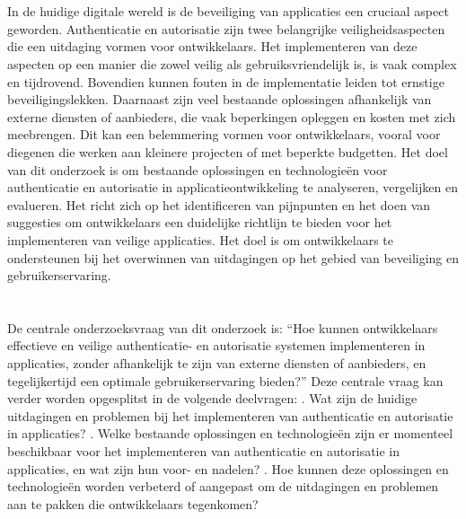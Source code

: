 \section{}%
\label{sec:probleemstelling}
In de huidige digitale wereld is de beveiliging van applicaties een cruciaal aspect geworden. Authenticatie en autorisatie zijn twee belangrijke veiligheidsaspecten die een uitdaging vormen voor ontwikkelaars. 
Het implementeren van deze aspecten op een manier die zowel veilig als gebruiksvriendelijk is, is vaak complex en tijdrovend. Bovendien kunnen fouten in de implementatie leiden tot ernstige beveiligingslekken. 
\newline
Daarnaast zijn veel bestaande oplossingen afhankelijk van externe diensten of aanbieders, die vaak beperkingen opleggen en kosten met zich meebrengen. Dit kan een belemmering vormen voor ontwikkelaars, 
vooral voor diegenen die werken aan kleinere projecten of met beperkte budgetten.
\newline
Het doel van dit onderzoek is om bestaande oplossingen en technologieën voor authenticatie en autorisatie in applicatieontwikkeling te analyseren, vergelijken en evalueren. 
Het richt zich op het identificeren van pijnpunten en het doen van suggesties om ontwikkelaars een duidelijke richtlijn te bieden voor het implementeren van veilige applicaties. 
Het doel is om ontwikkelaars te ondersteunen bij het overwinnen van uitdagingen op het gebied van beveiliging en gebruikerservaring.

\section{}%
\label{sec:onderzoeksvraag}

De centrale onderzoeksvraag van dit onderzoek is: ``Hoe kunnen ontwikkelaars effectieve en veilige authenticatie- en autorisatie systemen implementeren in applicaties, zonder afhankelijk te zijn van 
externe diensten of aanbieders, en tegelijkertijd een optimale gebruikerservaring bieden?''
\newline
\newline
Deze centrale vraag kan verder worden opgesplitst in de volgende deelvragen:
\newline
{}. Wat zijn de huidige uitdagingen en problemen bij het implementeren van authenticatie en autorisatie in applicaties?
. Welke bestaande oplossingen en technologieën zijn er momenteel beschikbaar voor het implementeren van authenticatie en autorisatie in applicaties, en wat zijn hun voor- en nadelen?
. Hoe kunnen deze oplossingen en technologieën worden verbeterd of aangepast om de uitdagingen en problemen aan te pakken die ontwikkelaars tegenkomen?



